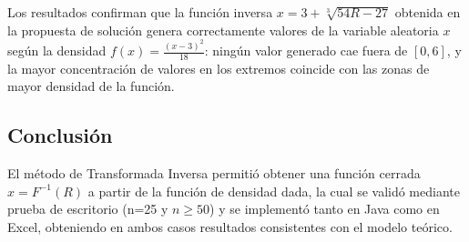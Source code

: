 Los resultados confirman que la función inversa $x = 3 + \sqrt[3]{54R-27}$ obtenida en la propuesta de solución genera correctamente valores de la variable aleatoria $x$ según la densidad $f(x) = \frac{(x-3)^2}{18}$: ningún valor generado cae fuera de $[0,6]$, y la mayor concentración de valores en los extremos coincide con las zonas de mayor densidad de la función.

\subsection{Conclusión}

El método de Transformada Inversa permitió obtener una función cerrada $x=F^{-1}(R)$ a partir de la función de densidad dada, la cual se validó mediante prueba de escritorio (n=25 y $n \geq 50$) y se implementó tanto en Java como en Excel, obteniendo en ambos casos resultados consistentes con el modelo teórico.
